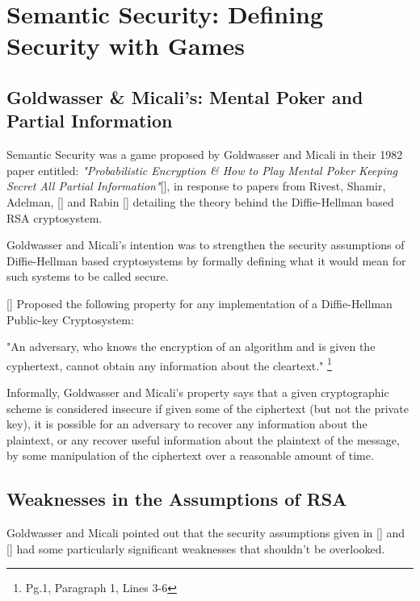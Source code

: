 \section{Semantic Security: Defining Security with Games} 

\subsection{Goldwasser \& Micali's: Mental Poker and Partial Information} 


Semantic Security was a game proposed by Goldwasser and Micali in their 1982 paper entitled: \textit{"Probabilistic Encryption \& How to Play Mental Poker Keeping Secret All Partial Information"}[\cite{Gol19820}], in response to papers from Rivest, Shamir, Adelman, [\cite{Riv19780}] and Rabin [\cite{Rab19790}] detailing the theory behind the Diffie-Hellman based RSA cryptosystem. 

Goldwasser and Micali's intention was to strengthen the security assumptions of Diffie-Hellman based cryptosystems by formally defining what it would mean for such systems to be called secure. 


[\cite{Gol19820}] Proposed the following property for any implementation of a Diffie-Hellman Public-key Cryptosystem:  
\begin{prop}{"An adversary, who knows the encryption of an algorithm and is given the cyphertext, cannot obtain any information about the cleartext."} \footnote{\cite{Gol1982} Pg.1, Paragraph 1, Lines 3-6} 
\end{prop}


Informally, Goldwasser and Micali's property says that a given cryptographic scheme is considered insecure if given some of the ciphertext (but not the private key), it is possible for an adversary to recover any information about the plaintext, or any recover useful information about the plaintext of the message, by some manipulation of the ciphertext over a reasonable amount of time. 


\subsection{Weaknesses in the Assumptions of RSA} 


Goldwasser and Micali pointed out that the security assumptions given in [\cite{Rab19790}] and  [\cite{Riv19780}] had some particularly significant weaknesses that shouldn't be overlooked.


